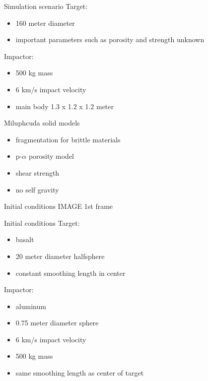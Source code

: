 \documentclass{beamer}
\begin{document}
\begin{frame}{Simulation scenario}
Target:
\begin{itemize}
	\item 160 meter diameter \pause
	\item important parameters such as porosity and strength unknown \pause
\end{itemize} 
Impactor:
\begin{itemize}
	\item 500 kg mass \pause
	\item 6 km/s impact velocity \pause
	\item main body 1.3 x 1.2 x 1.2 meter \pause
\end{itemize} 
\end{frame}


\begin{frame}{Miluphcuda solid models}
	\begin{itemize}
		\item fragmentation for brittle materials \pause
		\item p-$\alpha$ porosity model \pause
		\item shear strength \pause
		\item no self gravity \pause

	\end{itemize}
\end{frame}

\begin{frame}{Initial conditions}
	IMAGE 1st frame
\end{frame}

\begin{frame}{Initial conditions}
Target:
\begin{itemize}
	\item basalt \pause
	\item 20 meter diameter halfsphere \pause
	\item constant smoothing length in center \pause
\end{itemize} 
Impactor:
\begin{itemize}
	\item aluminum \pause
	\item 0.75 meter diameter sphere \pause
	\item 6 km/s impact velocity \pause
	\item 500 kg mass \pause
	\item same smoothing length as center of target \pause
\end{itemize} 
\end{frame}
\end{document}
